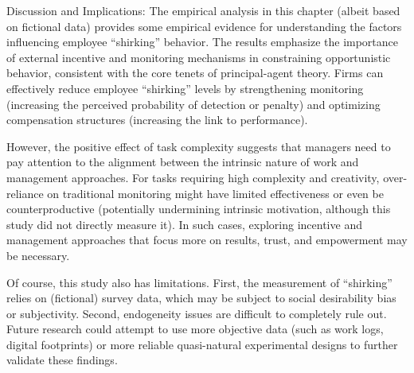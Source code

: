 {Discussion and Implications}:
The empirical analysis in this chapter (albeit based on fictional data) provides some empirical evidence for understanding the factors influencing employee \enquote{shirking} behavior. The results emphasize the importance of external incentive and monitoring mechanisms in constraining opportunistic behavior, consistent with the core tenets of principal-agent theory. Firms can effectively reduce employee \enquote{shirking} levels by strengthening monitoring (increasing the perceived probability of detection or penalty) and optimizing compensation structures (increasing the link to performance).

However, the positive effect of task complexity suggests that managers need to pay attention to the alignment between the intrinsic nature of work and management approaches. For tasks requiring high complexity and creativity, over-reliance on traditional monitoring might have limited effectiveness or even be counterproductive (potentially undermining intrinsic motivation, although this study did not directly measure it). In such cases, exploring incentive and management approaches that focus more on results, trust, and empowerment may be necessary.

Of course, this study also has limitations. First, the measurement of \enquote{shirking} relies on (fictional) survey data, which may be subject to social desirability bias or subjectivity. Second, endogeneity issues are difficult to completely rule out. Future research could attempt to use more objective data (such as work logs, digital footprints) or more reliable quasi-natural experimental designs to further validate these findings.
